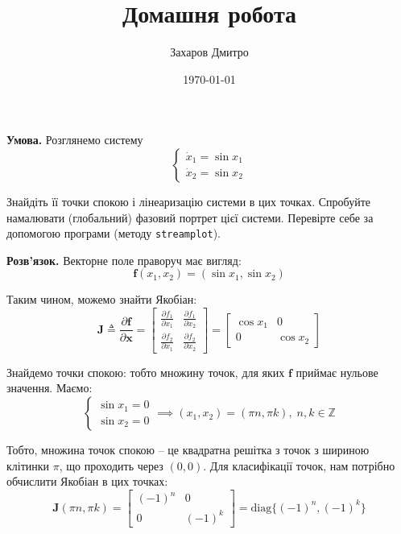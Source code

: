 \documentclass[oneside,solution]{tmpl}
\title{Домашня робота}
\author{Захаров Дмитро}
\date{\today}
\begin{document}
\maketitle



\textbf{Умова.} Розглянемо систему
\begin{equation}
    \begin{cases}
        \dot{x}_1 = \sin x_1 \\
        \dot{x}_2 = \sin x_2
    \end{cases}
\end{equation}

Знайдіть її точки спокою і лінеаризацію системи в цих точках. Спробуйте намалювати (глобальний) фазовий портрет цієї системи. Перевірте себе за допомогою програми (методу \texttt{streamplot}). 

\textbf{Розв'язок.} Векторне поле праворуч має вигляд:
\begin{equation}
    \boldsymbol{f}(x_1,x_2) = (\sin x_1, \sin x_2)
\end{equation}

Таким чином, можемо знайти Якобіан:
\begin{equation}
    \boldsymbol{J} \triangleq \frac{\partial \boldsymbol{f}}{\partial \mathbf{x}} = \begin{bmatrix}
        \frac{\partial f_1}{\partial x_1} & \frac{\partial f_1}{\partial x_2} \\
        \frac{\partial f_2}{\partial x_1} & \frac{\partial f_2}{\partial x_2}
    \end{bmatrix} = \begin{bmatrix}
        \cos x_1 & 0 \\ 0 & \cos x_2
    \end{bmatrix}
\end{equation}

Знайдемо точки спокою: тобто множину точок, для яких $\boldsymbol{f}$ приймає нульове значення. Маємо:
\begin{equation}
    \begin{cases}
        \sin x_1 = 0 \\ 
        \sin x_2 = 0
    \end{cases} \implies (x_1,x_2) = (\pi n, \pi k), \; n,k \in \mathbb{Z}
\end{equation}

Тобто, множина точок спокою -- це квадратна решітка з точок з шириною клітинки $\pi$, що проходить через $(0,0)$. Для класифікації точок, нам потрібно обчислити Якобіан в цих точках:
\begin{equation}
    \boldsymbol{J}(\pi n, \pi k) = \begin{bmatrix}
        (-1)^n & 0 \\ 0 & (-1)^k
    \end{bmatrix} = \text{diag} \{(-1)^n, (-1)^k\}
\end{equation}
\end{document}
